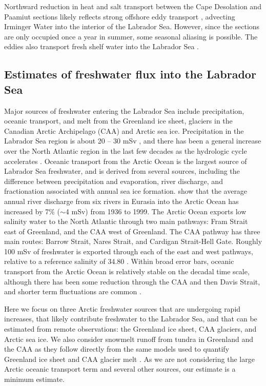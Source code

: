 Northward reduction in heat and salt transport between the Cape Desolation and Paamiut sections likely reflects strong offshore eddy transport \cite[]{jakobsen2003}, advecting Irminger Water into the interior of the Labrador Sea.   However, since the sections are only occupied once a year in summer, some seasonal aliasing is possible.  The eddies also transport fresh shelf water into the Labrador Sea \cite[]{myers2009}. 
  
\subsection{Estimates of freshwater flux into the Labrador Sea}
Major sources of freshwater entering the Labrador Sea include precipitation, oceanic transport, and melt from the Greenland ice sheet, glaciers in the Canadian Arctic Archipelago (CAA) and Arctic sea ice. Precipitation in the Labrador Sea region is about 20 – 30 mSv \cite[]{myers2007a} , and there has been a general increase over the North Atlantic region in the last few decades as the hydrologic cycle accelerates \cite[]{josey2005}.  Oceanic transport from the Arctic Ocean is the largest source of Labrador Sea freshwater, and is derived from several sources, including the difference between precipitation and evaporation, river discharge, and fractionation associated with annual sea ice formation.  \citet{peterson2002} show that the average annual river discharge from six rivers in Eurasia into the Arctic Ocean has increased by 7\% ($\sim$4 mSv) from 1936 to 1999.  The Arctic Ocean exports low salinity water to the North Atlantic through two main pathways: Fram Strait east of Greenland, and the CAA west of Greenland.  The CAA pathway has three main routes: Barrow Strait, Nares Strait, and Cardigan Strait-Hell Gate.  Roughly 100 mSv of freshwater is exported through each of the east and west pathways, relative to a reference salinity of 34.80 \cite[]{haine2015}.  Within broad error bars, oceanic transport from the Arctic Ocean is relatively stable on the decadal time scale, although there has been some reduction through the CAA and then Davis Strait, and shorter term fluctuations are common \cite[]{haine2015,castro2015,curry2014}.  

Here we focus on three Arctic freshwater sources that are undergoing rapid increases, that likely contribute freshwater to the Labrador Sea, and that can be estimated from remote observations: the Greenland ice sheet, CAA glaciers, and Arctic sea ice.  We also consider snowmelt runoff from tundra in Greenland and the CAA as they follow directly from the same models used to quantify Greenland ice sheet and CAA glacier melt \cite[]{bamber2012,lenaerts2013}.  As we are not considering the large Arctic oceanic transport term and several other sources, our estimate is a minimum estimate.

